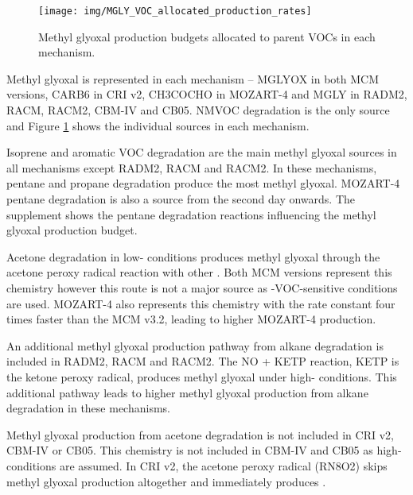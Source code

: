 \begin{figure}
    \centering
    \texttt{[image: img/MGLY\_VOC\_allocated\_production\_rates]}
    \vspace{0mm}
    \caption{Methyl glyoxal production budgets allocated to parent VOCs in each mechanism.}
    \vspace{-4mm}
    \label{f:mglyox_budgets} 
\end{figure} 

Methyl glyoxal is represented in each mechanism -- MGLYOX in both MCM versions, CARB6 in CRI v2, CH3COCHO in MOZART-4 and MGLY in RADM2, RACM, RACM2, CBM-IV and CB05.
NMVOC degradation is the only source and Figure \ref{f:mglyox_budgets} shows the individual sources in each mechanism.

Isoprene and aromatic VOC degradation are the main methyl glyoxal sources in all mechanisms except RADM2, RACM and RACM2.
In these mechanisms, pentane and propane degradation produce the most methyl glyoxal.
MOZART-4 pentane degradation is also a source from the second day onwards.
The supplement shows the pentane degradation reactions influencing the methyl glyoxal production budget.

Acetone degradation in low- conditions produces methyl glyoxal through the acetone peroxy radical reaction with other  \citep{Fu:2008}.
Both MCM versions represent this chemistry however this route is not a major source as -VOC-sensitive conditions are used.  
MOZART-4 also represents this chemistry with the rate constant four times faster than the MCM v3.2, leading to higher MOZART-4 production.

An additional methyl glyoxal production pathway from alkane degradation is included in RADM2, RACM and RACM2.
The NO + KETP reaction, KETP is the ketone peroxy radical, produces methyl glyoxal under high- conditions.
This additional pathway leads to higher methyl glyoxal production from alkane degradation in these mechanisms.

Methyl glyoxal production from acetone degradation is not included in CRI v2, CBM-IV or CB05.
This chemistry is not included in CBM-IV and CB05 as high- conditions are assumed.
In CRI v2, the acetone peroxy radical (RN8O2) skips methyl glyoxal production altogether and immediately produces .
